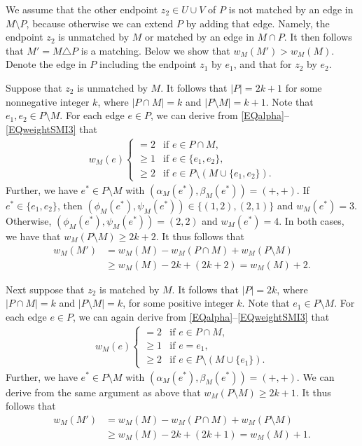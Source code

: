 \documentclass[11pt,a4paper,showkeys]{article}
\theoremstyle{plain}
\theoremstyle{definition}
\begin{document}
We assume that the other endpoint $z_2\in U\cup V$ of $P$ is not matched by an edge in $M\setminus P$, 
because otherwise we can extend $P$ by adding that edge. 
Namely, 
the endpoint $z_2$ is unmatched by $M$ 
or matched by an edge in $M\cap P$. 
It then follows that $M'=M\triangle P$ is a matching. 
Below we show that $w_M(M')> w_M(M)$. 
Denote the edge in $P$ including the endpoint $z_1$ by $e_1$, 
and that for $z_2$ by $e_2$. 

Suppose that $z_2$ is unmatched by $M$. 
It follows that $|P|=2k+1$ for some nonnegative integer $k$, 
where $|P\cap M| = k$ and $|P\setminus M|=k+1$. 
Note that $e_1,e_2\in P\setminus M$. 
For each edge $e\in P$, 
we can derive from \eqref{EQalpha}--\eqref{EQweightSMI3} that 
\begin{align*}
    w_M(e) 
    \begin{cases}
        =   2 & \mbox{if $e\in P\cap M$},\\
        \ge 1 & \mbox{if $e \in \{e_1,e_2\}$}, \\
        \ge 2 & \mbox{if $e\in P \setminus (M\cup \{e_1,e_2\}) $}. 
    \end{cases}
\end{align*}
Further, we have $e^*\in P \setminus M $ with 
$(\alpha_M(e^*),\beta_M(e^*))=(+,+)$. 
If $e^* \in \{e_1,e_2\}$, 
then $(\phi_M(e^*),\psi_M(e^*))\in \{(1,2),(2,1)\}$ and $w_M(e^*)= 3$. 
Otherwise, 
$(\phi_M(e^*),\psi_M(e^*)) = (2,2)$ and $w_M(e^*)=4$. 
In both cases, 
we have that $w_M(P\setminus M) \ge 2k+2$. 
It thus follows that 
\begin{align*}
    w_M(M') 
    {}&{}= w_M(M) - w_M(P\cap M) + w_M(P\setminus M) \\
    {}&{}\ge w_M(M) - 2k + (2k+2) = w_M(M) + 2.
\end{align*}

Next suppose that $z_2$ is matched by $M$. 
It follows that $|P|=2k$, 
where $|P\cap M| = k$ and $|P\setminus M|=k$, 
for some positive integer $k$. 
Note that $e_1\in P \setminus M$. 
For each edge $e\in P$, 
we can again derive from \eqref{EQalpha}--\eqref{EQweightSMI3} that 
\begin{align*}
    w_M(e) 
    \begin{cases}
        =   2 & \mbox{if $e\in P\cap M$},\\
        \ge 1 & \mbox{if $e = e_1$}, \\
        \ge 2 & \mbox{if $e\in P \setminus (M\cup \{e_1\}) $}. 
    \end{cases}
\end{align*}
Further, we have $e^*\in P \setminus M $ with 
$(\alpha_M(e^*),\beta_M(e^*))=(+,+)$. 
We can derive from the same argument as above that $w_M(P\setminus M)\ge 2k+1$. 
It thus follows that 
\begin{align*}
    w_M(M') 
    {}&{}= w_M(M) - w_M(P\cap M) + w_M(P\setminus M) \\
    {}&{}\ge w_M(M) - 2k + (2k+1) = w_M(M) + 1.
\end{align*}
\end{document}
